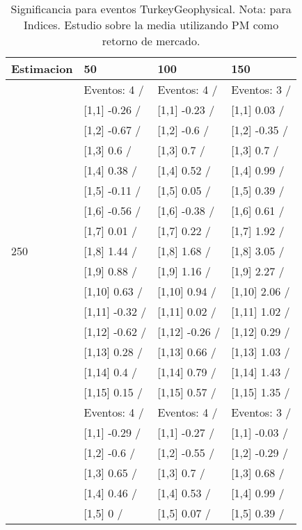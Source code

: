 \begin{table}

\caption{Significancia para eventos TurkeyGeophysical. Nota: para Indices. Estudio sobre la media utilizando PM como retorno de mercado.}
\centering
\begin{tabular}[t]{llll}
\toprule
Estimacion & 50 & 100 & 150\\
\midrule
 & Eventos:  4 / & Eventos:  4 / & Eventos:  3 /\\
 & {}[1,1] -0.26  / & {}[1,1] -0.23  / & {}[1,1] 0.03  /\\
 & {}[1,2] -0.67  / & {}[1,2] -0.6  / & {}[1,2] -0.35  /\\
 & {}[1,3] 0.6  / & {}[1,3] 0.7  / & {}[1,3] 0.7  /\\
 & {}[1,4] 0.38  / & {}[1,4] 0.52  / & {}[1,4] 0.99  /\\
\addlinespace
 & {}[1,5] -0.11  / & {}[1,5] 0.05  / & {}[1,5] 0.39  /\\
 & {}[1,6] -0.56  / & {}[1,6] -0.38  / & {}[1,6] 0.61  /\\
 & {}[1,7] 0.01  / & {}[1,7] 0.22  / & {}[1,7] 1.92  /\\
250 & {}[1,8] 1.44  / & {}[1,8] 1.68  / & {}[1,8] 3.05  /\\
 & {}[1,9] 0.88  / & {}[1,9] 1.16  / & {}[1,9] 2.27  /\\
\addlinespace
 & {}[1,10] 0.63  / & {}[1,10] 0.94  / & {}[1,10] 2.06  /\\
 & {}[1,11] -0.32  / & {}[1,11] 0.02  / & {}[1,11] 1.02  /\\
 & {}[1,12] -0.62  / & {}[1,12] -0.26  / & {}[1,12] 0.29  /\\
 & {}[1,13] 0.28  / & {}[1,13] 0.66  / & {}[1,13] 1.03  /\\
 & {}[1,14] 0.4  / & {}[1,14] 0.79  / & {}[1,14] 1.43  /\\
\addlinespace
 & {}[1,15] 0.15  / & {}[1,15] 0.57  / & {}[1,15] 1.35  /\\
 & Eventos:  4 / & Eventos:  4 / & Eventos:  3 /\\
 & {}[1,1] -0.29  / & {}[1,1] -0.27  / & {}[1,1] -0.03  /\\
 & {}[1,2] -0.6  / & {}[1,2] -0.55  / & {}[1,2] -0.29  /\\
 & {}[1,3] 0.65  / & {}[1,3] 0.7  / & {}[1,3] 0.68  /\\
\addlinespace
 & {}[1,4] 0.46  / & {}[1,4] 0.53  / & {}[1,4] 0.99  /\\
 & {}[1,5] 0  / & {}[1,5] 0.07  / & {}[1,5] 0.39  /\\

\end{tabular}
\end{table}

